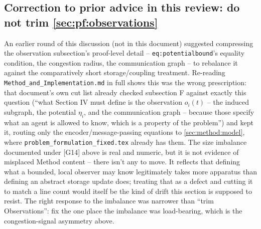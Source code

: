 \documentclass[11pt]{article}
\begin{document}
\subsection*{Correction to prior advice in this review: do not trim \ref{sec:pf:observations}}
An earlier round of this discussion (not in this document) suggested
compressing the observation subsection's proof-level detail --
\texttt{eq:potentialbound}'s equality condition, the congestion radius, the
communication graph -- to rebalance it against the comparatively short
storage/coupling treatment. Re-reading \texttt{Method\_and\_Implementation.md}
in full shows this was the wrong prescription: that document's own cut list
already checked subsection F against exactly this question (``what Section IV
must define is the observation $o_i(t)$ -- the induced subgraph, the potential
$\eta_i$, and the communication graph -- because those specify what an agent
is allowed to know, which is a property of the problem'') and kept it,
routing only the encoder/message-passing equations to
\ref{sec:method:model}, where \texttt{problem\_formulation\_fixed.tex}
already has them. The size imbalance documented under [G14] above is real and
numeric, but it is not evidence of misplaced Method content -- there isn't
any to move. It reflects that defining what a bounded, local observer may
know legitimately takes more apparatus than defining an abstract storage
update does; treating that as a defect and cutting it to match a line count
would itself be the kind of drift this section is supposed to resist. The
right response to the imbalance was narrower than ``trim Observations'': fix
the one place the imbalance was load-bearing, which is the congestion-signal
asymmetry above.
\end{document}

